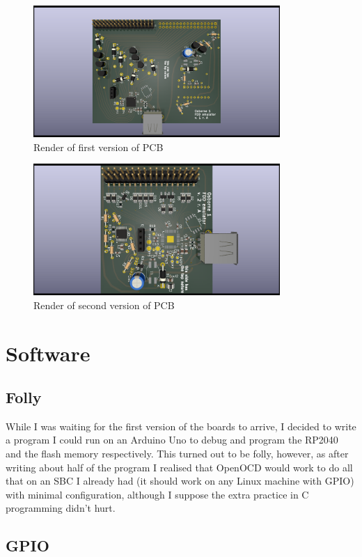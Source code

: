 \documentclass[a4paper]{article}
\begin{document}
\begin{figure}
  \centering
  \includegraphics[height=5cm]{pcb-v1}
  \caption{Render of first version of PCB}
\end{figure}

\begin{figure}
  \centering
  \includegraphics[height=5cm]{pcb-v2}
  \caption{Render of second version of PCB}
\end{figure}

\section{Software}

\subsection{Folly}

While I was waiting for the first version of the boards to arrive, I
decided to write a program I could run on an Arduino Uno to debug and
program the RP2040 and the flash memory respectively. This turned out
to be folly, however, as after writing about half of the program I
realised that OpenOCD would work to do all that on an SBC I already
had (it should work on any Linux machine with GPIO) with minimal
configuration, although I suppose the extra practice in C programming
didn't hurt.

\subsection{GPIO}
\end{document}
